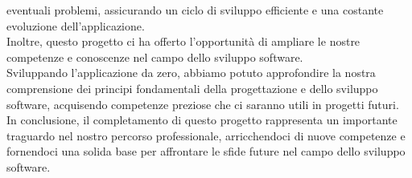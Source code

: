 eventuali problemi, assicurando un ciclo di sviluppo efficiente e una costante evoluzione dell'applicazione.\\
Inoltre, questo progetto ci ha offerto l'opportunità di ampliare le nostre competenze e conoscenze nel campo dello sviluppo software.\\
Sviluppando l'applicazione da zero, abbiamo potuto approfondire la nostra comprensione dei principi fondamentali della progettazione
e dello sviluppo software, acquisendo competenze preziose che ci saranno utili in progetti futuri.\\
In conclusione, il completamento di questo progetto rappresenta un importante traguardo nel nostro percorso professionale,
arricchendoci di nuove competenze e fornendoci una solida base per affrontare le sfide future nel campo dello sviluppo software.